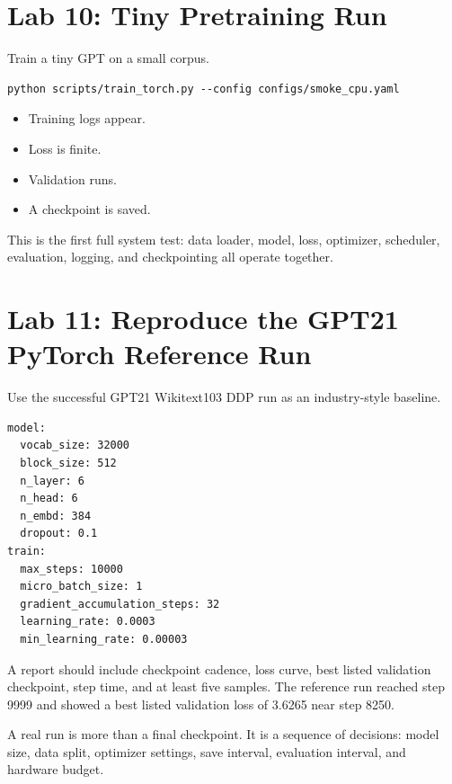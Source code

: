 \section{Lab 10: Tiny Pretraining Run}

 Train a tiny GPT on a small corpus.


\begin{lstlisting}
python scripts/train_torch.py --config configs/smoke_cpu.yaml
\end{lstlisting}


\begin{itemize}
  \item Training logs appear.
  \item Loss is finite.
  \item Validation runs.
  \item A checkpoint is saved.
\end{itemize}

 This is the first full system test: data loader, model, loss, optimizer, scheduler, evaluation, logging, and checkpointing all operate together.

\section{Lab 11: Reproduce the GPT21 PyTorch Reference Run}

 Use the successful GPT21 Wikitext103 DDP run as an industry-style baseline.


\begin{lstlisting}
model:
  vocab_size: 32000
  block_size: 512
  n_layer: 6
  n_head: 6
  n_embd: 384
  dropout: 0.1
train:
  max_steps: 10000
  micro_batch_size: 1
  gradient_accumulation_steps: 32
  learning_rate: 0.0003
  min_learning_rate: 0.00003
\end{lstlisting}

 A report should include checkpoint cadence, loss curve, best listed validation checkpoint, step time, and at least five samples. The reference run reached step 9999 and showed a best listed validation loss of 3.6265 near step 8250.

 A real run is more than a final checkpoint. It is a sequence of decisions: model size, data split, optimizer settings, save interval, evaluation interval, and hardware budget.


